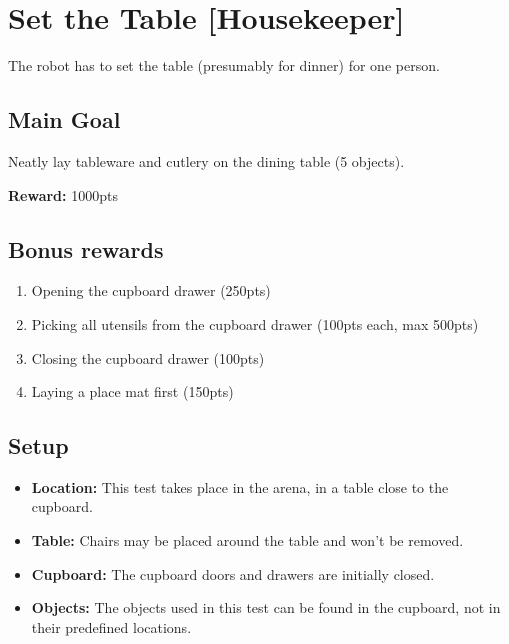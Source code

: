 \section{Set the Table [Housekeeper]}
The robot has to set the table (presumably for dinner) for one person.


\subsection*{Main Goal}
Neatly lay tableware and cutlery on the dining table (5 objects).

\noindent\textbf{Reward:} 1000pts

\subsection*{Bonus rewards}
\begin{enumerate}[nosep]
	\item Opening the cupboard drawer (250pts)
	\item Picking all utensils from the cupboard drawer (100pts each, max 500pts)
	\item Closing the cupboard drawer (100pts)
	\item Laying a place mat first (150pts)
\end{enumerate}

\subsection*{Setup}
\begin{itemize}[nosep]
	\item \textbf{Location:} This test takes place in the arena, in a table close to the cupboard.
	\item \textbf{Table:} Chairs may be placed around the table and won't be removed.
	\item \textbf{Cupboard:} The cupboard doors and drawers are initially closed.
	\item \textbf{Objects:} The objects used in this test can be found in the cupboard, not in their predefined locations.
\end{itemize}


